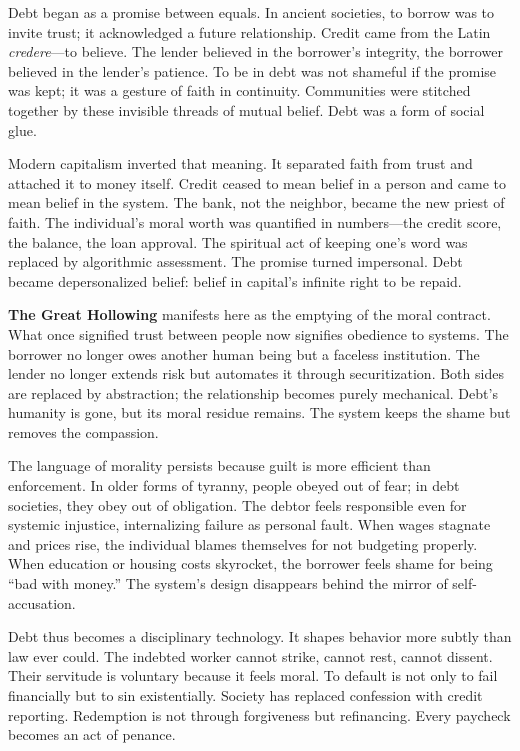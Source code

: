 \documentclass[11pt,twoside]{book}
\begin{document}
Debt began as a promise between equals.  In ancient societies, to borrow was to invite trust; it acknowledged a future relationship.  Credit came from the Latin \emph{credere}—to believe.  The lender believed in the borrower’s integrity, the borrower believed in the lender’s patience.  To be in debt was not shameful if the promise was kept; it was a gesture of faith in continuity.  Communities were stitched together by these invisible threads of mutual belief.  Debt was a form of social glue.

Modern capitalism inverted that meaning.  It separated faith from trust and attached it to money itself.  Credit ceased to mean belief in a person and came to mean belief in the system.  The bank, not the neighbor, became the new priest of faith.  The individual’s moral worth was quantified in numbers—the credit score, the balance, the loan approval.  The spiritual act of keeping one’s word was replaced by algorithmic assessment.  The promise turned impersonal.  Debt became depersonalized belief: belief in capital’s infinite right to be repaid.

\textbf{The Great Hollowing} manifests here as the emptying of the moral contract.  What once signified trust between people now signifies obedience to systems.  The borrower no longer owes another human being but a faceless institution.  The lender no longer extends risk but automates it through securitization.  Both sides are replaced by abstraction; the relationship becomes purely mechanical.  Debt’s humanity is gone, but its moral residue remains.  The system keeps the shame but removes the compassion.

The language of morality persists because guilt is more efficient than enforcement.  In older forms of tyranny, people obeyed out of fear; in debt societies, they obey out of obligation.  The debtor feels responsible even for systemic injustice, internalizing failure as personal fault.  When wages stagnate and prices rise, the individual blames themselves for not budgeting properly.  When education or housing costs skyrocket, the borrower feels shame for being “bad with money.”  The system’s design disappears behind the mirror of self-accusation.

Debt thus becomes a disciplinary technology.  It shapes behavior more subtly than law ever could.  The indebted worker cannot strike, cannot rest, cannot dissent.  Their servitude is voluntary because it feels moral.  To default is not only to fail financially but to sin existentially.  Society has replaced confession with credit reporting.  Redemption is not through forgiveness but refinancing.  Every paycheck becomes an act of penance.
\end{document}
